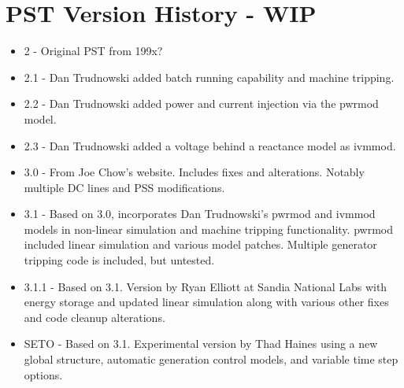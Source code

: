 \chapter{PST Version History - WIP}



\begin{itemize}
 em
\singlespacing
\item 2 - Original PST from 199x?
\item 2.1 - Dan Trudnowski added batch running capability and machine tripping.
\item 2.2 - Dan Trudnowski added power and current injection via the pwrmod model.
\item 2.3 - Dan Trudnowski added a voltage behind a reactance model as ivmmod.
\item 3.0 - From Joe Chow's website. 
Includes fixes and alterations. 
Notably multiple DC lines and PSS modifications.
\item 3.1 - Based on 3.0, incorporates Dan Trudnowski's pwrmod and ivmmod models in non-linear simulation and machine tripping functionality.
pwrmod included linear simulation and various model patches. 
Multiple generator tripping code is included, but untested.
\item 3.1.1 - Based on 3.1. Version by Ryan Elliott at Sandia National Labs with energy storage and updated linear simulation along with various other fixes and code cleanup alterations. 
\item SETO - Based on 3.1. Experimental version by Thad Haines using a new global structure, automatic generation control models, and variable time step options. 



\end{itemize}
